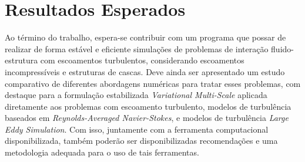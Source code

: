 \chapter{Resultados Esperados} \label{ResultadosEsperados}

Ao término do trabalho, espera-se contribuir com um programa que possar de realizar de forma estável e eficiente simulações de problemas de interação fluido-estrutura com escoamentos turbulentos, considerando escoamentos incompressíveis e estruturas de cascas. Deve ainda ser apresentado um estudo comparativo de diferentes abordagens numéricas para tratar esses problemas, com destaque para a formulação estabilizada \textit{Variational Multi-Scale} aplicada diretamente aos problemas com escoamento turbulento, modelos de turbulência baseados em \textit{Reynolds-Averaged Navier-Stokes}, e modelos de turbulência \textit{Large Eddy Simulation}. Com isso, juntamente com a ferramenta computacional disponibilizada, também poderão ser disponibilizadas recomendações e uma metodologia adequada para o uso de tais ferramentas.
